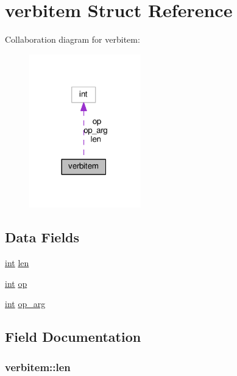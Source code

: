\hypertarget{structverbitem}{}\section{verbitem Struct Reference}
\label{structverbitem}


Collaboration diagram for verbitem\+:
\nopagebreak
\begin{figure}[H]
\begin{center}
\leavevmode
\includegraphics[width=137pt]{structverbitem__coll__graph}
\end{center}
\end{figure}
\subsection*{Data Fields}
\begin{DoxyCompactItemize}
\item 
\hyperlink{pcre_8txt_a42dfa4ff673c82d8efe7144098fbc198}{int} \hyperlink{structverbitem_a994a1be4cb5b66cb2041ffe76476ce0b}{len}
\item 
\hyperlink{pcre_8txt_a42dfa4ff673c82d8efe7144098fbc198}{int} \hyperlink{structverbitem_a15cb4ddbd5304975ec67a2e50415e5d9}{op}
\item 
\hyperlink{pcre_8txt_a42dfa4ff673c82d8efe7144098fbc198}{int} \hyperlink{structverbitem_ad1956196d39f60ecae091dc6c4747a69}{op\+\_\+arg}
\end{DoxyCompactItemize}


\subsection{Field Documentation}
\subsubsection[{\texorpdfstring{len}{len}}]{ verbitem\+::len}\hypertarget{structverbitem_a994a1be4cb5b66cb2041ffe76476ce0b}{}\label{structverbitem_a994a1be4cb5b66cb2041ffe76476ce0b}
